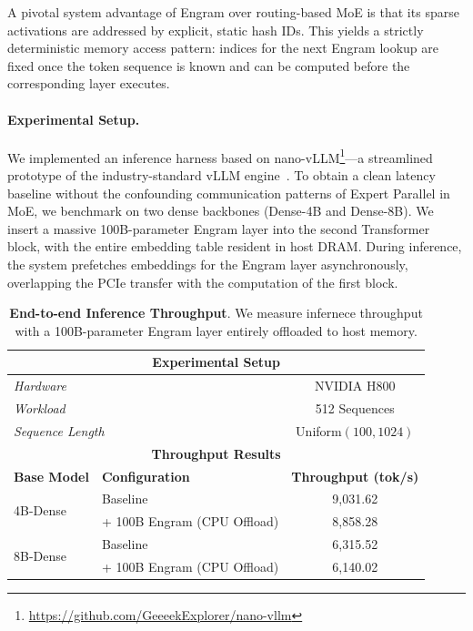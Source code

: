 A pivotal system advantage of Engram over routing-based MoE is that its sparse activations are addressed by explicit, static hash IDs. This yields a strictly deterministic memory access pattern: indices for the next Engram lookup are fixed once the token sequence is known and can be computed before the corresponding layer executes. 

\paragraph{Experimental Setup.}
We implemented an inference harness based on nano-vLLM\footnote{\url{https://github.com/GeeeekExplorer/nano-vllm}}—a streamlined prototype of the industry-standard vLLM engine~\citep{kwon2023efficient}. To obtain a clean latency baseline without the confounding communication patterns of Expert Parallel in MoE, we benchmark on two dense backbones (Dense-4B and Dense-8B).
We insert a massive 100B-parameter Engram layer into the second Transformer block, with the entire embedding table resident in host DRAM.
During inference, the system prefetches embeddings for the Engram layer asynchronously, overlapping the PCIe transfer with the computation of the first block.

\begin{table}[htbp]
    \centering
    \caption{\textbf{End-to-end Inference Throughput}. We measure infernece throughput with a 100B-parameter Engram layer entirely offloaded to host memory.}
    \label{tab:vllm}
    \vspace{2mm}
    \begin{tabular}{llc}
        \toprule
        \multicolumn{3}{c}{\textbf{Experimental Setup}} \\
        \midrule
        \multicolumn{2}{l}{\textit{Hardware}} & NVIDIA H800 \\
        \multicolumn{2}{l}{\textit{Workload}} & 512 Sequences \\
        \multicolumn{2}{l}{\textit{Sequence Length}} & Uniform$(100, 1024)$ \\
        \midrule
        \multicolumn{3}{c}{\textbf{Throughput Results}} \\
        \midrule
        \textbf{Base Model} & \textbf{Configuration} & \textbf{Throughput (tok/s)} \\
        \midrule
        \multirow{2}{*}{4B-Dense} 
            & Baseline & 9,031.62 \\
            & + 100B Engram (CPU Offload) & 8,858.28 \\
        \midrule
        \multirow{2}{*}{8B-Dense} 
            & Baseline & 6,315.52 \\
            & + 100B Engram (CPU Offload) & 6,140.02 \\
        \bottomrule
    \end{tabular}
\end{table}


